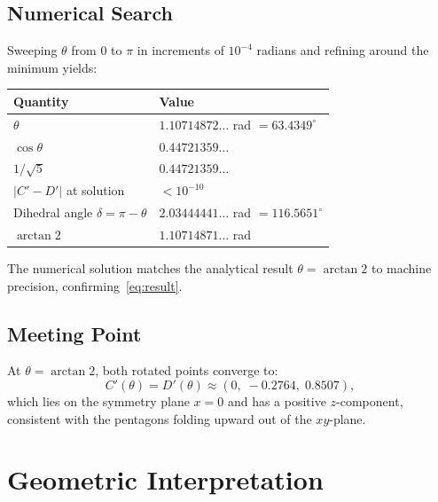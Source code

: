 \documentclass[11pt,a4paper]{article}
\theoremstyle{definition}
\begin{document}
\subsection{Numerical Search}

Sweeping $\theta$ from $0$ to $\pi$ in increments of $10^{-4}$ radians and refining
around the minimum yields:

\begin{center}
\begin{tabular}{@{}ll@{}}
\toprule
Quantity & Value \\
\midrule
$\theta$ & $1.10714872\ldots$ rad $= 63.4349^\circ$ \\
$\cos\theta$ & $0.44721359\ldots$ \\
$1/\sqrt{5}$ & $0.44721359\ldots$ \\
$|C' - D'|$ at solution & $< 10^{-10}$ \\
\midrule
Dihedral angle $\delta = \pi - \theta$ & $2.03444441\ldots$ rad $= 116.5651^\circ$ \\
$\arctan 2$ & $1.10714871\ldots$ rad \\
\bottomrule
\end{tabular}
\end{center}

The numerical solution matches the analytical result $\theta = \arctan 2$ to machine
precision, confirming~\eqref{eq:result}.

\subsection{Meeting Point}

At $\theta = \arctan 2$, both rotated points converge to:
\[
  C'(\theta) = D'(\theta) \approx (0,\; -0.2764,\; 0.8507),
\]
which lies on the symmetry plane $x = 0$ and has a positive $z$-component, consistent
with the pentagons folding upward out of the $xy$-plane.

\section{Geometric Interpretation}
\label{sec:interp}
\end{document}
